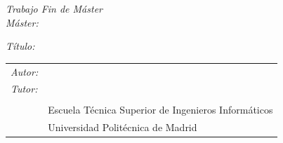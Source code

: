 \begin{titlepage}
  \vspace*{4cm}
  \noindent
  \textit{Trabajo Fin de Máster}\\
  \textit{Máster:} \Grado{}
  
  \textit{Título:} \TituloTFG{}

  \Fecha

  \vspace*{3cm}

  \noindent
  \begin{tabular}{ll}
     \textit{Autor:} & \NombreAutor{}  \\
     \textit{Tutor:} & \NombreTutor{}  \\
     & \Departamento{} \\
     & Escuela Técnica Superior de Ingenieros Informáticos\\
     & Universidad Politécnica de Madrid
  \end{tabular}

\end{titlepage}
